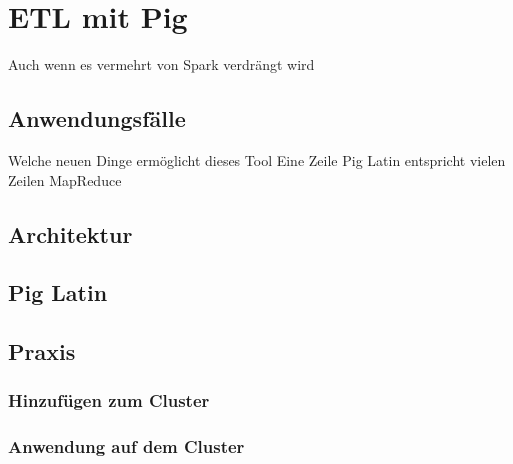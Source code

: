 \chapter{ETL mit Pig}
Auch wenn es vermehrt von Spark verdrängt wird
\section{Anwendungsfälle}
Welche neuen Dinge ermöglicht dieses Tool
Eine Zeile Pig Latin entspricht vielen Zeilen MapReduce
\section{Architektur}
\section{Pig Latin}
\section{Praxis}
\subsection{Hinzufügen zum Cluster}
\subsection{Anwendung auf dem Cluster}